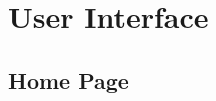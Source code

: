 \documentclass[12pt,oneside,openright,a4paper]{cpe-english-project}
\begin{document}
  \section{User Interface}
    \subsection{Home Page}
    \begin{figure}[H]
      \centering
      \begin{minipage}{.5\textwidth}
        \centering
      \end{minipage}%
      \begin{minipage}{.3\textwidth}
        \centering

\end{minipage}
\end{figure}
\end{document}
